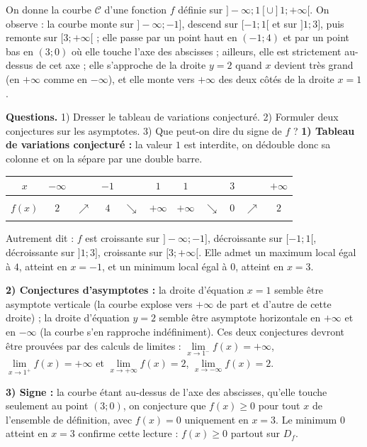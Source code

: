 \documentclass[11pt]{article}
\begin{document}
\begin{exoresolu}
On donne la courbe $\mathcal{C}$ d'une fonction $f$ définie sur $]-\infty ; 1[ \cup ]1 ; +\infty[$. On observe : la courbe monte sur $]-\infty ; -1]$, descend sur $[-1 ; 1[$ et sur $]1 ; 3]$, puis remonte sur $[3 ; +\infty[$ ; elle passe par un point haut en $(-1 ; 4)$ et par un point bas en $(3 ; 0)$ où elle touche l'axe des abscisses ; ailleurs, elle est strictement au-dessus de cet axe ; elle s'approche de la droite $y = 2$ quand $x$ devient très grand (en $+\infty$ comme en $-\infty$), et elle monte vers $+\infty$ des deux côtés de la droite $x = 1$.
\par \textbf{Questions.} 1) Dresser le tableau de variations conjecturé. 2) Formuler deux conjectures sur les asymptotes. 3) Que peut-on dire du signe de $f$ ?
\tcblower
\textbf{1) Tableau de variations conjecturé :} la valeur $1$ est interdite, on dédouble donc sa colonne et on la sépare par une double barre.
\begin{center}
\begin{tabular}{|c|ccccc||ccccc|}
\hline
\rowcolor{popblueL}
$x$ & $-\infty$ & & $-1$ & & $1$ & $1$ & & $3$ & & $+\infty$ \\
\hline
 & & & & & & & & & & \\
$f(x)$ & $2$ & $\nearrow$ & $4$ & $\searrow$ & $+\infty$ & $+\infty$ & $\searrow$ & $0$ & $\nearrow$ & $2$ \\
 & & & & & & & & & & \\
\hline
\end{tabular}
\end{center}
Autrement dit : $f$ est croissante sur $]-\infty ; -1]$, décroissante sur $[-1 ; 1[$, décroissante sur $]1 ; 3]$, croissante sur $[3 ; +\infty[$. Elle admet un maximum local égal à $4$, atteint en $x = -1$, et un minimum local égal à $0$, atteint en $x = 3$.
\par\textbf{2) Conjectures d'asymptotes :} la droite d'équation $x = 1$ semble être asymptote verticale (la courbe explose vers $+\infty$ de part et d'autre de cette droite) ; la droite d'équation $y = 2$ semble être asymptote horizontale en $+\infty$ et en $-\infty$ (la courbe s'en rapproche indéfiniment). Ces deux conjectures devront être prouvées par des calculs de limites : $\lim\limits_{x \to 1^-} f(x) = +\infty$, $\lim\limits_{x \to 1^+} f(x) = +\infty$ et $\lim\limits_{x \to +\infty} f(x) = 2$, $\lim\limits_{x \to -\infty} f(x) = 2$.
\par\textbf{3) Signe :} la courbe étant au-dessus de l'axe des abscisses, qu'elle touche seulement au point $(3 ; 0)$, on conjecture que $f(x) \geq 0$ pour tout $x$ de l'ensemble de définition, avec $f(x) = 0$ uniquement en $x = 3$. Le minimum $0$ atteint en $x = 3$ confirme cette lecture : $f(x) \geq 0$ partout sur $D_f$.
\end{exoresolu}
\end{document}
